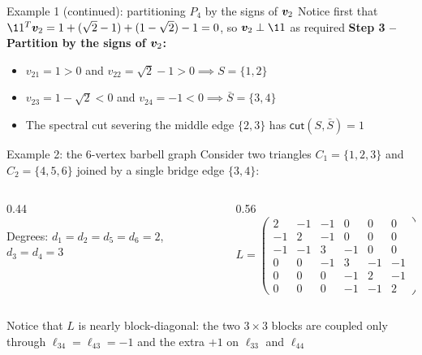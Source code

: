 \documentclass[aspectratio=169]{beamer}\usepackage[]{graphicx}\usepackage[]{xcolor}
\begin{document}
\begin{frame}{Example 1 (continued): partitioning $P_4$ by the signs of $\bm{v}_2$}
Notice first that $\11^T \bv_2 = 1 + (\sqrt{2}-1) + (1-\sqrt{2}) - 1 = 0$, so $\bv_2 \perp \11$ as required
\vfill
\textbf{Step 3 -- Partition by the signs of $\bm{v}_2$:}
\begin{itemize}
\item $v_{21} = 1 > 0$ and $v_{22} = \sqrt{2}-1 > 0 \implies S = \{1, 2\}$
\vfill
\item $v_{23} = 1-\sqrt{2} < 0$ and $v_{24} = -1 < 0 \implies \bar{S} = \{3, 4\}$
\vfill
\item The spectral cut severing the middle edge $\{2, 3\}$ has $\mathsf{cut}(S, \bar{S}) = 1$
\end{itemize}
\end{frame}


\begin{frame}{Example 2: the 6-vertex barbell graph}
Consider two triangles $C_1 = \{1, 2, 3\}$ and $C_2 = \{4, 5, 6\}$ joined by a single bridge edge $\{3, 4\}$:
\vfill
\begin{columns}[c]
\begin{column}{0.44\textwidth}
\centering
{}
\vskip0.2cm
\footnotesize
Degrees: $d_1 = d_2 = d_5 = d_6 = 2$, $d_3 = d_4 = 3$
\end{column}
\begin{column}{0.56\textwidth}
\[
L = \left(\begin{array}{ccc|ccc}
2 & -1 & -1 & 0 & 0 & 0 \\
-1 & 2 & -1 & 0 & 0 & 0 \\
-1 & -1 & 3 & -1 & 0 & 0 \\ \hline
0 & 0 & -1 & 3 & -1 & -1 \\
0 & 0 & 0 & -1 & 2 & -1 \\
0 & 0 & 0 & -1 & -1 & 2
\end{array}\right)
\]
\end{column}
\end{columns}
\vfill
Notice that $L$ is nearly block-diagonal: the two $3\times 3$ blocks are coupled only through $\ell_{34} = \ell_{43} = -1$ and the extra $+1$ on $\ell_{33}$ and $\ell_{44}$
\end{frame}
\end{document}
